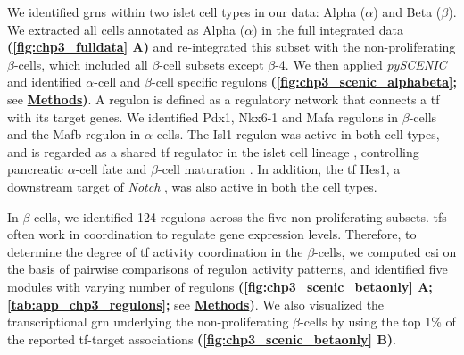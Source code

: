 
\par We identified \glspl{grn} within two islet cell types in our data: Alpha ($\alpha$) and Beta ($\beta$). We extracted all cells annotated as Alpha ($\alpha$) in the full integrated data \textbf{(\autoref{fig:chp3_fulldata} A)} and re-integrated this subset with the non-proliferating $\beta$-cells, which included all $\beta$-cell subsets except $\beta$-4. We then applied \textit{pySCENIC} and identified $\alpha$-cell and $\beta$-cell specific regulons \textbf{(\autoref{fig:chp3_scenic_alphabeta};} see \hyperref[subsubsec:met_chp3_scenic]{\textbf{Methods}}\textbf{)}. A regulon is defined as a regulatory network that connects a \gls{tf} with its target genes. We identified Pdx1, Nkx6-1 and Mafa regulons in $\beta$-cells and the Mafb regulon in $\alpha$-cells. The Isl1 regulon was active in both cell types, and is regarded as a shared \gls{tf} regulator in the islet cell lineage \textbf{\cite{juhl_mouse_2008}}, controlling pancreatic $\alpha$-cell fate and $\beta$-cell maturation \textbf{\cite{bohuslavova_isl1_2023}}. In addition, the \gls{tf} Hes1, a downstream target of \textit{Notch} \textbf{\cite{hashemitabar_redefining_2019}}, was also active in both the cell types.\\



\par In $\beta$-cells, we identified 124 regulons across the five non-proliferating subsets. \glspl{tf} often work in coordination to regulate gene expression levels. Therefore, to determine the degree of \gls{tf} activity coordination in the $\beta$-cells, we computed \gls{csi} on the basis of pairwise comparisons of regulon activity patterns, and identified five modules with varying number of regulons \textbf{(\autoref{fig:chp3_scenic_betaonly} A; \autoref{tab:app_chp3_regulons};} see \hyperref[subsubsec:met_chp3_scenic]{\textbf{Methods}}\textbf{)}. We also visualized the transcriptional \gls{grn} underlying the non-proliferating $\beta$-cells by using the top 1\% of the reported \gls{tf}-target associations \textbf{(\autoref{fig:chp3_scenic_betaonly} B)}.

